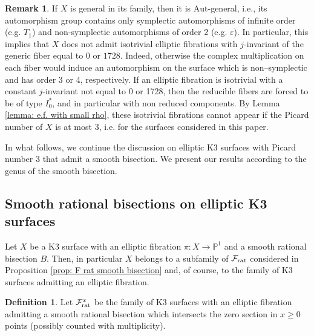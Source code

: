 \documentclass{amsart}
\theoremstyle{definition}
\newtheorem{definition}[theorem]{Definition}
\newtheorem{remark}[theorem]{Remark}
\numberwithin{equation}{section}
\newcommand{\ra}{\rightarrow}
\begin{document}
\begin{remark} If $X$ is general in its family, then it is $\mathrm{Aut}$-general, i.e., its automorphism group contains only symplectic automorphisms of infinite order (e.g. $T_1$) and non-symplectic automorphisms of order 2 (e.g. $\varepsilon$). In particular, this implies that $X$ does not admit isotrivial elliptic fibrations with $j$-invariant of the generic fiber equal to $0$ or $1728$. Indeed, otherwise the complex multiplication on each fiber would induce an automorphism on the surface which is non--symplectic and has order 3 or 4, respectively. If an elliptic fibration is isotrivial with a constant $j$-invariant not equal to 0 or 1728, then the reducible fibers are forced to be of type $I_0^*$, and in particular with non reduced components. By Lemma \ref{lemma: e.f. with small rho}, these isotrivial fibrations cannot appear if the Picard number of $X$ is at most 3, i.e. for the surfaces considered in this paper. \end{remark}
	


In what follows, we continue the discussion on elliptic K3 surfaces with Picard number 3 that admit a smooth bisection. We present our results according to the genus of the smooth bisection.


\subsection{Smooth rational bisections on elliptic K3 surfaces}\label{subsec: Frat x}

Let $X$ be a K3 surface with an elliptic fibration $\pi:X\ra \mathbb{P}^1$ and a smooth rational bisection $B$. Then, in particular $X$ belongs to a subfamily of $\mathcal{F}_{\rm{rat}}$ considered in Proposition \ref{prop: F rat smooth bisection} and, of course, to the family of K3 surfaces admitting an elliptic fibration. 
	
	\begin{definition} Let $\mathcal{F}_{\rm{rat}}^x$ be the family of K3 surfaces with an elliptic fibration admitting a smooth rational bisection which intersects the zero section in $x\geq 0$ points (possibly counted with multiplicity).\end{definition}
\end{document}
